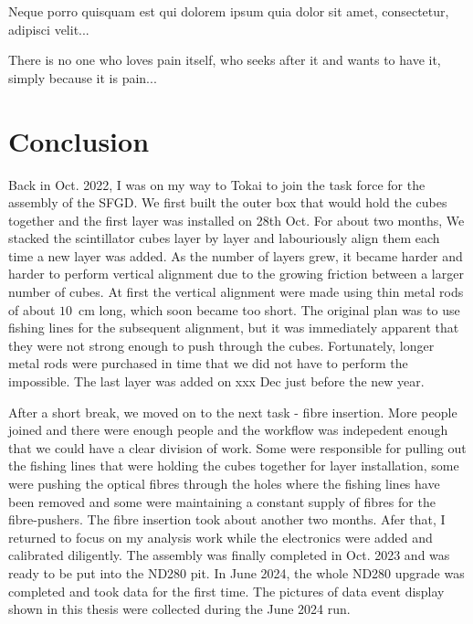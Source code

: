 \begin{savequote}[8cm]
\textlatin{Neque porro quisquam est qui dolorem ipsum quia dolor sit amet, consectetur, adipisci velit...}

There is no one who loves pain itself, who seeks after it and wants to have it, simply because it is pain...
\end{savequote}

\chapter{\label{ch:1-concl}Conclusion} 

\minitoc

Back in Oct. 2022, I was on my way to Tokai to join the task force for the assembly of the SFGD.
We first built the outer box that would hold the cubes together and the first layer was installed on 28th Oct.
For about two months, We stacked the scintillator cubes layer by layer and labouriously align them each time a new layer was added.
As the number of layers grew, it became harder and harder to perform vertical alignment due to the growing friction between a larger number of cubes.
At first the vertical alignment were made using thin metal rods of about $10$~cm long, which soon became too short.
The original plan was to use fishing lines for the subsequent alignment, but it was immediately apparent that they were not strong enough to push through the cubes.
Fortunately, longer metal rods were purchased in time that we did not have to perform the impossible.
The last layer was added on xxx Dec just before the new year.

After a short break, we moved on to the next task - fibre insertion.
More people joined and there were enough people and the workflow was indepedent enough that we could have a clear division of work.
Some were responsible for pulling out the fishing lines that were holding the cubes together for layer installation, some were pushing the optical fibres through the holes where the fishing lines have been removed and some were maintaining a constant supply of fibres for the fibre-pushers.
The fibre insertion took about another two months.
Afer that, I returned to focus on my analysis work while the electronics were added and calibrated diligently.
The assembly was finally completed in Oct. 2023 and was ready to be put into the ND280 pit.
In June 2024, the whole ND280 upgrade was completed and took data for the first time.
The pictures of data event display shown in this thesis were collected during the June 2024 run.

